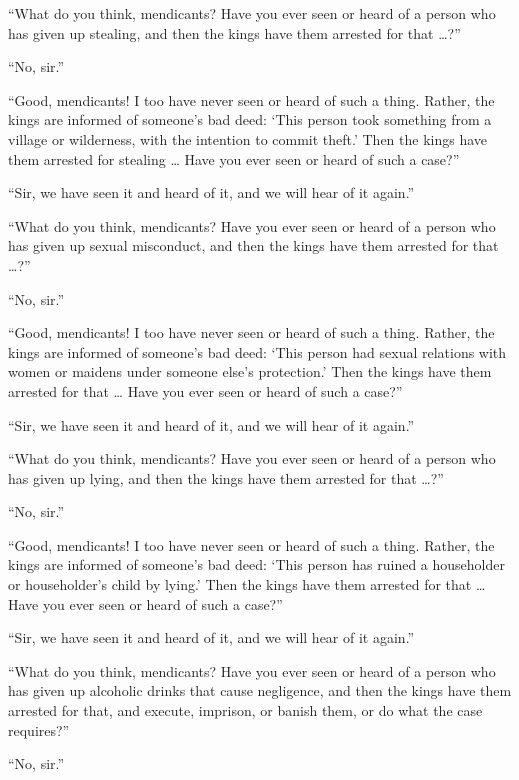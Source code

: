 \documentclass[12pt,openany]{book}%
\begin{document}
“What do you think, mendicants? Have you ever seen or heard of a person who has given up stealing, and then the kings have them arrested for that …?” 

“No, sir.” 

“Good, mendicants! I too have never seen or heard of such a thing. Rather, the kings are informed of someone’s bad deed: ‘This person took something from a village or wilderness, with the intention to commit theft.’ Then the kings have them arrested for stealing … Have you ever seen or heard of such a case?” 

“Sir, we have seen it and heard of it, and we will hear of it again.” 

“What do you think, mendicants? Have you ever seen or heard of a person who has given up sexual misconduct, and then the kings have them arrested for that …?” 

“No, sir.” 

“Good, mendicants! I too have never seen or heard of such a thing. Rather, the kings are informed of someone’s bad deed: ‘This person had sexual relations with women or maidens under someone else’s protection.’ Then the kings have them arrested for that … Have you ever seen or heard of such a case?” 

“Sir, we have seen it and heard of it, and we will hear of it again.” 

“What do you think, mendicants? Have you ever seen or heard of a person who has given up lying, and then the kings have them arrested for that …?” 

“No, sir.” 

“Good, mendicants! I too have never seen or heard of such a thing. Rather, the kings are informed of someone’s bad deed: ‘This person has ruined a householder or householder’s child by lying.’ Then the kings have them arrested for that … Have you ever seen or heard of such a case?” 

“Sir, we have seen it and heard of it, and we will hear of it again.” 

“What do you think, mendicants? Have you ever seen or heard of a person who has given up alcoholic drinks that cause negligence, and then the kings have them arrested for that, and execute, imprison, or banish them, or do what the case requires?” 

“No, sir.” 
\end{document}
